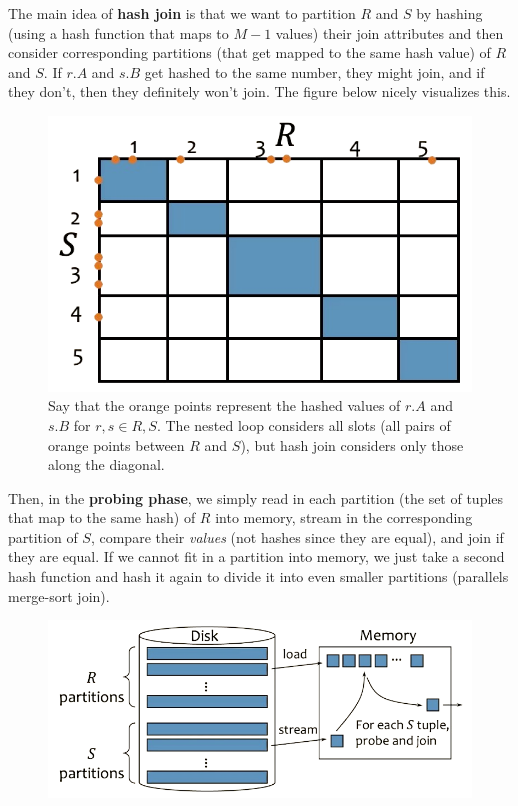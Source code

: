     \begin{definition}
      The main idea of \textbf{hash join} is that we want to partition $R$ and $S$ by hashing (using a hash function that maps to $M-1$ values) their join attributes and then consider corresponding partitions (that get mapped to the same hash value) of $R$ and $S$. If $r.A$ and $s.B$ get hashed to the same number, they might join, and if they don't, then they definitely won't join. The figure below nicely visualizes this. 
    
      \begin{figure}[H]
        \centering 
        \includegraphics[scale=0.4]{img/hash_join.png}
        \caption{Say that the orange points represent the hashed values of $r.A$ and $s.B$ for $r, s \in R, S$. The nested loop considers all slots (all pairs of orange points between $R$ and $S$), but hash join considers only those along the diagonal. } 
        \label{fig:hash_join}
      \end{figure}

      Then, in the \textbf{probing phase}, we simply read in each partition (the set of tuples that map to the same hash) of $R$ into memory, stream in the corresponding partition of $S$, compare their \textit{values} (not hashes since they are equal), and join if they are equal. If we cannot fit in a partition into memory, we just take a second hash function and hash it again to divide it into even smaller partitions (parallels merge-sort join). 

      \begin{figure}[H]
        \centering 
        \includegraphics[scale=0.4]{img/hash_join2.png}
        \caption{} 
        \label{fig:hash_join2}
      \end{figure}


\end{definition}
